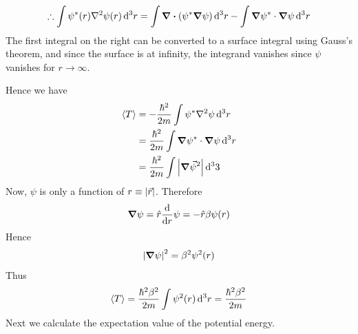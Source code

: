 	\begin{align}
		\therefore \int \psi^*\qty(r) \laplacian{\psi\qty(r)} \dd[3]{r} = \int \divergence \qty(\psi^* \grad{\psi}) \dd[3]{r} - \int \grad{\psi^*} \cdot \grad{\psi} \dd[3]{r}
		\end{align}
		The first integral on the right can be converted to a surface integral using Gauss's theorem, and since the surface is at infinity, the integrand vanishes since $\psi$ vanishes for $r \rightarrow \infty$.
		
		Hence we have
		\begin{align*}
			\expval{T} 
			&= -\frac{\hbar^2}{2 m} \int \psi^*\laplacian{\psi} \dd[3]{r} \\
			&= \frac{\hbar^2}{2 m} \int \grad{\psi^*} \cdot \grad{\psi} \dd[3]{r} \\
			&= \frac{\hbar^2}{2 m} \int \abs{\grad{\vec{\psi}}^2} \dd[3]{3}
		\end{align*}
		Now, $\psi$ is only a function of $r\equiv \abs{\vec{r}}$. Therefore
		\begin{align*}
			\grad{\psi} = \hat{r} \dv{}{r} \psi = -\hat{r} \beta \psi\qty(r)
		\end{align*}
		Hence
		\begin{align}
			\abs{\grad{\psi}}^2 = \beta^2 \psi^2\qty(r)
		\end{align}
		Thus
		\begin{align}
			\expval{T} = \frac{\hbar^2 \beta^2}{2 m} \int \psi^2\qty(r) \dd[3]{r} = \frac{\hbar^2 \beta^2}{2 m} 
		\end{align}
		Next we calculate the expectation value of the potential energy.
		
